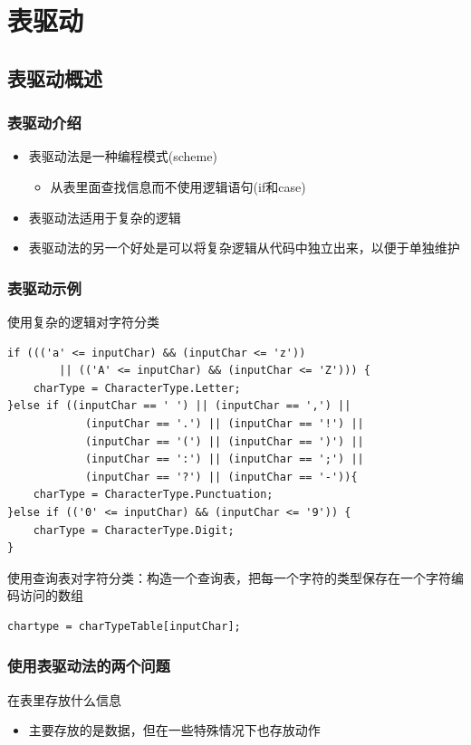 \section{表驱动}

\subsection{表驱动概述}

\subsubsection{表驱动介绍}
\begin{itemize}
    \item 表驱动法是一种编程模式(scheme)
    \begin{itemize}
        \item 从表里面查找信息而不使用逻辑语句(if和case)
    \end{itemize}
    \item 表驱动法适用于复杂的逻辑
    \item 表驱动法的另一个好处是可以将复杂逻辑从代码中独立出来，以便于单独维护
\end{itemize}

\subsubsection{表驱动示例}
使用复杂的逻辑对字符分类
\begin{lstlisting}
if ((('a' <= inputChar) && (inputChar <= 'z')) 
        || (('A' <= inputChar) && (inputChar <= 'Z'))) {
    charType = CharacterType.Letter;
}else if ((inputChar == ' ') || (inputChar == ',') ||
            (inputChar == '.') || (inputChar == '!') ||
            (inputChar == '(') || (inputChar == ')') ||
            (inputChar == ':') || (inputChar == ';') ||
            (inputChar == '?') || (inputChar == '-')){
    charType = CharacterType.Punctuation;
}else if (('0' <= inputChar) && (inputChar <= '9')) {
    charType = CharacterType.Digit;
}
\end{lstlisting}

使用查询表对字符分类：构造一个查询表，把每一个字符的类型保存在一个字符编码访问的数组
\begin{lstlisting}
chartype = charTypeTable[inputChar];
\end{lstlisting}

\subsubsection{使用表驱动法的两个问题}
在表里存放什么信息
\begin{itemize}
    \item 主要存放的是数据，但在一些特殊情况下也存放动作
\end{itemize}

